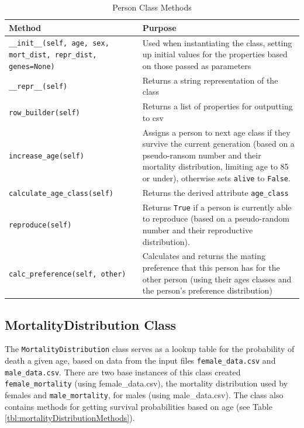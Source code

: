 \documentclass[authoryearcitations]{UoYCSproject}
\begin{document}
\begin{table}[h]
\caption{Person Class Methods}
\label{tbl:personMethods}
\begin{tabular}{m{} m{}}
\textbf{Method} & \textbf{Purpose} \\\hline
\texttt{\_\_init\_\_(self, age, sex, mort\_dist, repr\_dist, genes=None)} & Used when instantiating the class, setting up initial values for the properties based on those passed as parameters\\\hline
\texttt{\_\_repr\_\_(self)} & Returns a string representation of the class \\\hline
\texttt{row\_builder(self)} & Returns a list of properties for outputting to csv\\\hline
\texttt{increase\_age(self)} & Assigns a person to next age class if they survive the current generation (based on a pseudo-ransom number and their mortality distribution, limiting age to 85 or under), otherwise sets \texttt{alive} to \texttt{False}.\\\hline
\texttt{calculate\_age\_class(self)} & Returns the derived attribute \texttt{age\_class} \\\hline
\texttt{reproduce(self)} & Returns \texttt{True} if a person is currently able to reproduce (based on a pseudo-random number and their reproductive distribution). \\\hline
\texttt{calc\_preference(self, other)} & Calculates and returns the mating preference that this person has for the other person (using their ages classes and the person's preference distribution) \\\hline
\end{tabular}
\end{table}

\newpage
\subsection{MortalityDistribution Class}
The \texttt{MortalityDistribution} class serves as a lookup table for the probability of death a given age, based on data from the input files \texttt{female\_data.csv} and \texttt{male\_data.csv}. There are two base instances of this class created \texttt{female\_mortality} (using female\_data.csv), the mortality distribution used by females and \texttt{male\_mortality}, for males (using male\_data.csv). The class also contains methods for getting survival probabilities based on age (see Table \ref{tbl:mortalityDistributionMethods}).
\end{document}
